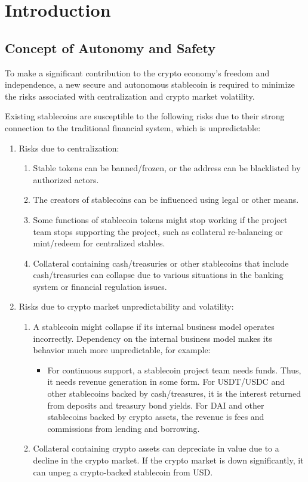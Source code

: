 \section{Introduction}

\subsection{Concept of Autonomy and Safety}

To make a significant contribution to the crypto economy's freedom 
and independence, a new secure and autonomous stablecoin is required 
to minimize the risks associated with centralization and crypto 
market volatility.

Existing stablecoins are susceptible to the following risks due to their 
strong connection to the traditional financial system, which is unpredictable:

\begin{enumerate}
\item Risks due to centralization:
	\begin{enumerate}
		\item Stable tokens can be banned/frozen, or the address can be blacklisted by authorized actors.
    \item The creators of stablecoins can be influenced using legal or other means.
    \item Some functions of stablecoin tokens might stop working if the project
    team stops supporting the project, such as collateral re-balancing or 
    mint/redeem for centralized stables.
    \item Collateral containing cash/treasuries or other stablecoins that include 
    cash/treasuries can collapse due to various situations in the banking system 
    or financial regulation issues.
  \end{enumerate}
\item Risks due to crypto market unpredictability and volatility:
	\begin{enumerate}
    \item A stablecoin might collapse if its internal business model operates incorrectly. 
    Dependency on the internal business model makes its behavior much more unpredictable, for example:
    \begin{itemize}
      \item For continuous support, a stablecoin project team needs funds. Thus, it needs 
      revenue generation in some form. For USDT/USDC and other stablecoins backed 
      by cash/treasures, it is the interest returned from deposits and treasury bond yields. 
      For DAI and other stablecoins backed by crypto assets, the revenue is fees and commissions 
      from lending and borrowing.
    \end{itemize}
    \item Collateral containing crypto assets can depreciate in value due to a decline 
    in the crypto market. If the crypto market is down significantly, it can unpeg 
    a crypto-backed stablecoin from USD.
  \end{enumerate}
\end{enumerate}



